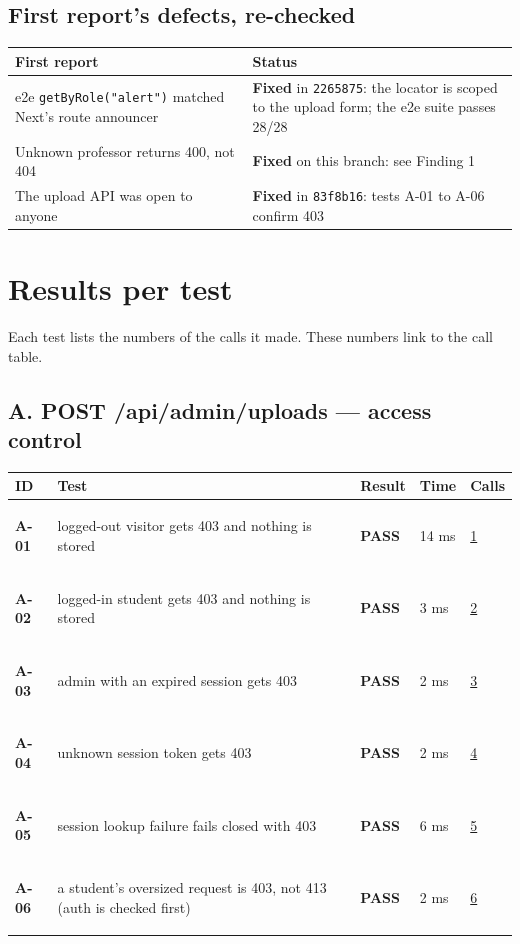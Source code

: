 \documentclass[10pt,a4paper]{article}
\begin{document}
\subsection*{First report's defects, re-checked}
\begin{longtable}{@{}P{7cm}P{9.5cm}@{}}
\toprule \textbf{First report} & \textbf{Status} \\ \midrule
e2e \texttt{getByRole("alert")} matched Next's route announcer & \textcolor{passgreen}{\textbf{Fixed}} in \texttt{2265875}: the locator is scoped to the upload form; the e2e suite passes 28/28 \\
Unknown professor returns 400, not 404 & \textcolor{passgreen}{\textbf{Fixed}} on this branch: see Finding 1 \\
The upload API was open to anyone & \textcolor{passgreen}{\textbf{Fixed}} in \texttt{83f8b16}: tests A-01 to A-06 confirm 403 \\
\bottomrule
\end{longtable}

\section*{Results per test}
Each test lists the numbers of the calls it made. These numbers link to the call table.

\subsection*{A. POST /api/admin/uploads — access control}
\begin{longtable}{@{}P{1.2cm}P{9.2cm}P{1.2cm}P{1.3cm}P{2.4cm}@{}}
\toprule \textbf{ID} & \textbf{Test} & \textbf{Result} & \textbf{Time} & \textbf{Calls} \\ \midrule \endhead
\hypertarget{test-A-01}{\textbf{A-01}} & logged-out visitor gets 403 and nothing is stored & \textcolor{passgreen}{\textbf{PASS}} & 14 ms & \hyperlink{call1}{1} \\
\hypertarget{test-A-02}{\textbf{A-02}} & logged-in student gets 403 and nothing is stored & \textcolor{passgreen}{\textbf{PASS}} & 3 ms & \hyperlink{call2}{2} \\
\hypertarget{test-A-03}{\textbf{A-03}} & admin with an expired session gets 403 & \textcolor{passgreen}{\textbf{PASS}} & 2 ms & \hyperlink{call3}{3} \\
\hypertarget{test-A-04}{\textbf{A-04}} & unknown session token gets 403 & \textcolor{passgreen}{\textbf{PASS}} & 2 ms & \hyperlink{call4}{4} \\
\hypertarget{test-A-05}{\textbf{A-05}} & session lookup failure fails closed with 403 & \textcolor{passgreen}{\textbf{PASS}} & 6 ms & \hyperlink{call5}{5} \\
\hypertarget{test-A-06}{\textbf{A-06}} & a student's oversized request is 403, not 413 (auth is checked first) & \textcolor{passgreen}{\textbf{PASS}} & 2 ms & \hyperlink{call6}{6} \\
\bottomrule
\end{longtable}
\end{document}
